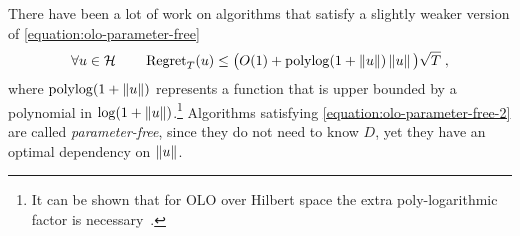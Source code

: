 There have been a lot of work on algorithms
\citep{Streeter-McMahan-2012, Orabona-2013, McMahan-Abernethy-2013,
McMahan-Orabona-2014} that satisfy a slightly weaker version of
\eqref{equation:olo-parameter-free}
\begin{equation}
\label{equation:olo-parameter-free-2}
\forall u \in \mathcal{H} \qquad \operatorname{Regret}_T(u) \le \big(O(1)+\operatorname{polylog}(1 + \left\|{u}\right\|)\left\|{u}\right\| \big) \sqrt{T} \; ,
\end{equation}
where $\operatorname{polylog}(1 + \left\|{u}\right\|)$ represents a function that is upper bounded
by a polynomial in $\log(1+\left\|{u}\right\|)$.\footnote{It can be shown
that for \ac{OLO} over Hilbert space the extra poly-logarithmic factor is
necessary~\citep{McMahan-Abernethy-2013,Orabona-2013}.} Algorithms satisfying
\eqref{equation:olo-parameter-free-2} are called \emph{parameter-free}, since
they do not need to know $D$, yet they have an optimal dependency on $\left\|{u}\right\|$.

